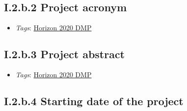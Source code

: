 \documentclass[a4paper,12pt]{report}
\begin{document}
\subsection*{\protect\textcolor{colorSecId}{I.2.b.2} Project acronym}

\label{1e85da40-bbfc-4180-903e-6c569ed2da38.c3dabaaf-c946-4a0d-889c-ede966f97667.afc53854-30c4-4236-a5be-7e49ad186b95.5b765df9-299f-4855-9e99-aa844903f8f6}


\begin{itemize}
  \item \textit{Tags}: \ul{Horizon 2020 DMP}
  \end{itemize}





\subsection*{\protect\textcolor{colorSecId}{I.2.b.3} Project abstract}

\label{1e85da40-bbfc-4180-903e-6c569ed2da38.c3dabaaf-c946-4a0d-889c-ede966f97667.afc53854-30c4-4236-a5be-7e49ad186b95.22583d74-3c98-4e0a-b363-26d767c88212}


\begin{itemize}
  \item \textit{Tags}: \ul{Horizon 2020 DMP}
  \end{itemize}





\subsection*{\protect\textcolor{colorSecId}{I.2.b.4} Starting date of the project}

\label{1e85da40-bbfc-4180-903e-6c569ed2da38.c3dabaaf-c946-4a0d-889c-ede966f97667.afc53854-30c4-4236-a5be-7e49ad186b95.de84b9b5-bcd0-4954-8370-72ea83916b8c}
\end{document}
